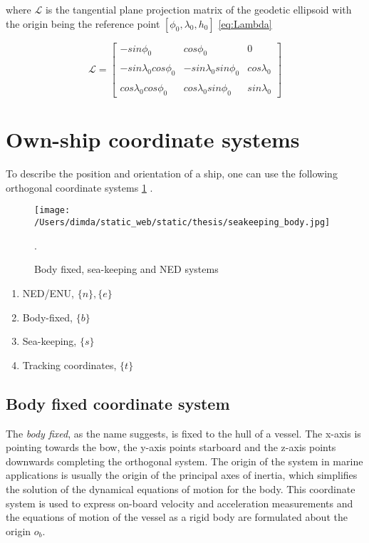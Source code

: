 where $\mathcal{L}$ is the tangential plane projection matrix of the geodetic ellipsoid with the origin being the reference point $[\phi_0,\lambda_0,h_0]$ \ref{eq:Lambda}




\begin{equation} \label{eq:Lambda}
\mathcal{L} = \begin{bmatrix}
-sin\phi_0  & cos\phi_0 & 0 \\\\
-sin\lambda_0cos\phi_0 & -sin\lambda_0sin\phi_0 & cos\lambda_0\\\\
cos\lambda_0 cos\phi_0 & cos\lambda_0 sin\phi_0 & sin\lambda_0
\end{bmatrix}
\end{equation}

\section{Own-ship coordinate systems}



To describe the position and orientation of a ship, one can use the following orthogonal coordinate systems  \cref{fig:ownship_frames} \cite{Perez2007} .


\begin{figure}[H] 	
	\centering
	\texttt{[image: /Users/dimda/static\_web/static/thesis/seakeeping\_body.jpg]}
	\caption{Body fixed, sea-keeping and NED systems \cite{Perez2007}}.
	\label{fig:ownship_frames}	
\end{figure}

\begin{enumerate}
	\item NED/ENU, $\{n\} , \{e\}$
	\item Body-fixed, $\{b\}$
	\item Sea-keeping, $\{s\}$
	\item Tracking coordinates, $\{t\}$
\end{enumerate}



\subsection{Body fixed coordinate system}


The \textit{body fixed}, as the name suggests, is fixed to the hull of a vessel. The x-axis is pointing towards the bow, the y-axis points starboard and the z-axis points downwards completing the orthogonal system. The origin of the system in marine applications is usually the origin of the principal axes of inertia, which simplifies the solution of the dynamical equations of motion for the body. This coordinate system is used to express on-board velocity and acceleration measurements and the equations of motion of the vessel as a rigid body are formulated about the origin $o_{b}$.

